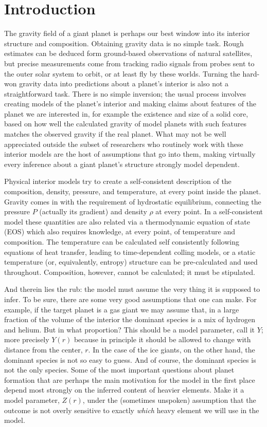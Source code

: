 
\section{Introduction}\label{sec:intro}
The gravity field of a giant planet is perhaps our best window into its interior
structure and composition. Obtaining gravity data is no simple task. Rough
estimates can be deduced form ground-based observations of natural satellites,
but precise measurements come from tracking radio signals from probes sent to
the outer solar system to orbit, or at least fly by these worlds. Turning the
hard-won gravity data into predictions about a planet's interior is also not a
straightforward task. There is no simple inversion; the usual process involves
creating models of the planet's interior and making claims about features of the
planet we are interested in, for example the existence and size of a solid core,
based on how well the calculated gravity of model planets with such features
matches the observed gravity if the real planet. What may not be well
appreciated outside the subset of researchers who routinely work with these
interior models are the host of assumptions that go into them, making virtually
every inference about a giant planet's structure strongly model dependent.

Physical interior models try to create a self-consistent description of the
composition, density, pressure, and temperature, at every point inside the
planet. Gravity comes in with the requirement of hydrostatic equilibrium,
connecting the pressure $P$ (actually its gradient) and density $\rho$ at every
point. In a self-consistent model these quantities are also related via a
thermodynamic equation of state (EOS) which also requires knowledge, at every
point, of temperature and composition. The temperature can be calculated
self consistently following equations of heat transfer, leading to
time-dependent colling models, or a static temperature (or, equivalently,
entropy) structure can be pre-calculated and used throughout. Composition,
however, cannot be calculated; it must be stipulated.

And therein lies the rub: the model must assume the very thing it is supposed to
infer. To be sure, there are some very good assumptions that one can make. For
example, if the target planet is a gas giant we may assume that, in a large
fraction of the volume of the interior the dominant species is a mix of hydrogen
and helium. But in what proportion? This should be a model parameter, call it
$Y$; more precisely $Y(r)$ because in principle it should be allowed to change
with distance from the center, $r$. In the case of the ice giants, on the other
hand, the dominant species is not so easy to guess. And of course, the dominant
species is not the only species. Some of the most important questions about
planet formation that are perhaps the main motivation for the model in the first
place depend most strongly on the inferred content of heavier elements. Make it
a model parameter, $Z(r)$, under the (sometimes unspoken) assumption that the
outcome is not overly sensitive to exactly \emph{which} heavy element we will
use in the model.

